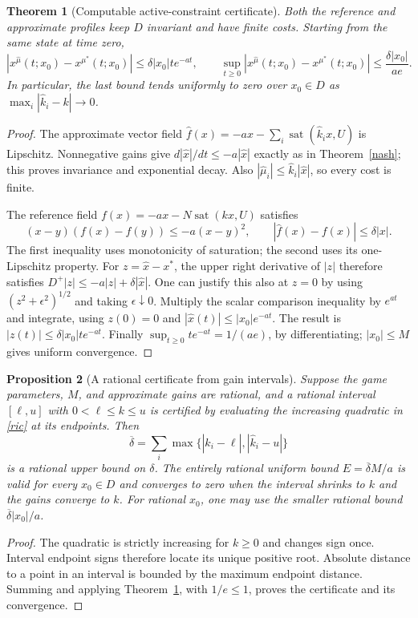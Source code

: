 \documentclass[11pt]{article}
\newtheorem{theorem}{Theorem}
\newtheorem{proposition}[theorem]{Proposition}
\theoremstyle{remark}
\newcommand{\sat}{\operatorname{sat}}
\begin{document}
\begin{theorem}[Computable active-constraint certificate]\label{error}
Both the reference and approximate profiles keep $D$ invariant and have finite costs. Starting from the same state at time zero,
\[
 |x^{\widehat\mu}(t;x_0)-x^{\mu^*}(t;x_0)|
 \leq \delta |x_0|t e^{-at},\qquad
 \sup_{t\geq0}|x^{\widehat\mu}(t;x_0)-x^{\mu^*}(t;x_0)|
 \leq \frac{\delta |x_0|}{ae}.
\]
In particular, the last bound tends uniformly to zero over $x_0\in D$ as $\max_i|\widehat k_i-k|\to0$.
\end{theorem}
\begin{proof}
The approximate vector field $\widehat f(x)=-ax-\sum_i\sat(\widehat k_i x,U)$ is Lipschitz. Nonnegative gains give $d|\widehat x|/dt\leq-a|\widehat x|$ exactly as in Theorem~\ref{nash}; this proves invariance and exponential decay. Also $|\widehat\mu_i|\leq\widehat k_i|\widehat x|$, so every cost is finite.

The reference field $f(x)=-ax-N\sat(kx,U)$ satisfies
\[
 (x-y)(f(x)-f(y))\leq-a(x-y)^2,
 \qquad |\widehat f(x)-f(x)|\leq\delta|x|.
\]
The first inequality uses monotonicity of saturation; the second uses its one-Lipschitz property. For $z=\widehat x-x^*$, the upper right derivative of $|z|$ therefore satisfies
$D^+|z|\leq-a|z|+\delta|\widehat x|$.
One can justify this also at $z=0$ by using $(z^2+\epsilon^2)^{1/2}$ and taking $\epsilon\downarrow0$. Multiply the scalar comparison inequality by $e^{at}$ and integrate, using $z(0)=0$ and $|\widehat x(t)|\leq|x_0|e^{-at}$. The result is $|z(t)|\leq\delta|x_0|t e^{-at}$. Finally $\sup_{t\geq0}te^{-at}=1/(ae)$, by differentiating; $|x_0|\leq M$ gives uniform convergence.
\end{proof}

\begin{proposition}[A rational certificate from gain intervals]
Suppose the game parameters, $M$, and approximate gains are rational, and a rational interval $[\ell,u]$ with $0<\ell\leq k\leq u$ is certified by evaluating the increasing quadratic in \eqref{ric} at its endpoints. Then
\[
 \overline\delta=\sum_i\max\{|\widehat k_i-\ell|,|\widehat k_i-u|\}
\]
is a rational upper bound on $\delta$. The entirely rational uniform bound
$E=\overline\delta M/a$ is valid for every $x_0\in D$ and converges to zero when the interval shrinks to $k$ and the gains converge to $k$. For rational $x_0$, one may use the smaller rational bound $\overline\delta|x_0|/a$.
\end{proposition}
\begin{proof}
The quadratic is strictly increasing for $k\geq0$ and changes sign once. Interval endpoint signs therefore locate its unique positive root. Absolute distance to a point in an interval is bounded by the maximum endpoint distance. Summing and applying Theorem~\ref{error}, with $1/e\leq1$, proves the certificate and its convergence.
\end{proof}
\end{document}
